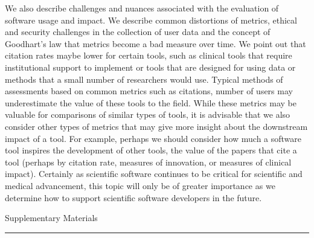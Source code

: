 \documentclass{article}
\begin{document}
We also describe challenges and nuances associated with the evaluation of software usage and impact. We describe common distortions of metrics, ethical and security challenges in the collection of user data and the concept of Goodhart's law that metrics become a bad measure over time. We point out that citation rates maybe lower for certain tools, such as clinical tools that require institutional support to implement or tools that are designed for using data or methods that a small number of researchers would use. Typical methods of assessments based on common metrics such as citations, number of users may underestimate the value of these tools to the field. While these metrics may be valuable for comparisons of similar types of tools, it is advisable that we also consider other types of metrics that may give more insight about the downstream impact of a tool. For example, perhaps we should consider how much a software tool inspires the development of other tools, the value of the papers that cite a tool (perhaps by citation rate, measures of innovation, or measures of clinical impact). Certainly as scientific software continues to be critical for scientific and medical advancement, this topic will only be of greater importance as we determine how to support scientific software developers in the future. 
 
 














 
 




\clearpage
\onecolumn



{\huge Supplementary Materials}

\hrule

\vspace*{0.5cm}
\end{document}
